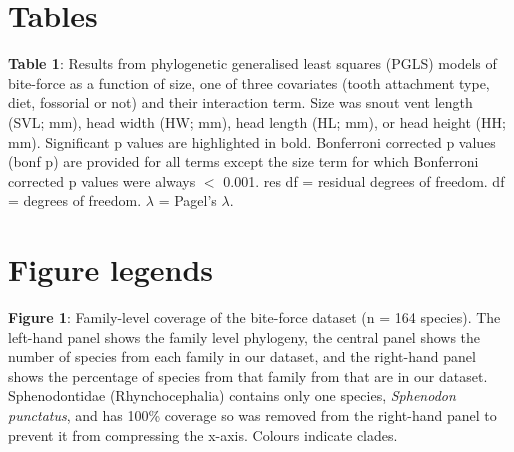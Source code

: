 \documentclass[a4paper, 12pt]{article}
\begin{document}




\newpage
\section{Tables}

\begin{landscape}
  
\end{landscape}

\textbf{Table 1}: Results from phylogenetic generalised least squares (PGLS) models of bite-force as a function of size, one of three covariates (tooth attachment type, diet, fossorial or not) and their interaction term. Size was snout vent length (SVL; mm), head width (HW; mm), head length (HL; mm), or head height (HH; mm). Significant p values are highlighted in bold. Bonferroni corrected p values (bonf p) are provided for all terms except the size term for which Bonferroni corrected p values were always $<$ 0.001. res df = residual degrees of freedom. df = degrees of freedom. $\lambda$ = Pagel's $\lambda$.


\newpage
\section{Figure legends}

\textbf{Figure 1}: 
  Family-level coverage of the bite-force dataset (n = 164 species). 
  The left-hand panel shows the family level phylogeny, the central panel shows the number of species from each family in our dataset, and the right-hand panel shows the percentage of species from that family from\cite{uetz2020reptile} that are in our dataset. 
  Sphenodontidae (Rhynchocephalia) contains only one species, \textit{Sphenodon punctatus}, and has 100\% coverage so was removed from the right-hand panel to prevent it from compressing the x-axis. 
  Colours indicate clades.
\end{document}
